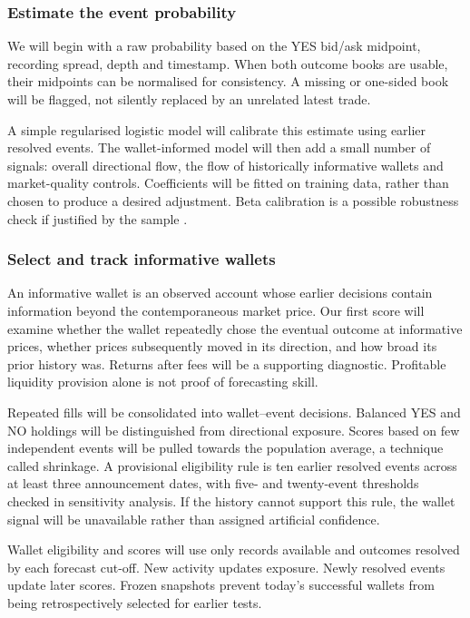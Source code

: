 \clearpage
\subsubsection{Estimate the event probability}
We will begin with a raw probability based on the YES bid/ask midpoint, recording spread, depth and timestamp. When both outcome books are usable, their midpoints can be normalised for consistency. A missing or one-sided book will be flagged, not silently replaced by an unrelated latest trade.

A simple regularised logistic model will calibrate this estimate using earlier resolved events. The wallet-informed model will then add a small number of signals: overall directional flow, the flow of historically informative wallets and market-quality controls. Coefficients will be fitted on training data, rather than chosen to produce a desired adjustment. Beta calibration is a possible robustness check if justified by the sample \cite{kull}.

\subsubsection{Select and track informative wallets}
An informative wallet is an observed account whose earlier decisions contain information beyond the contemporaneous market price. Our first score will examine whether the wallet repeatedly chose the eventual outcome at informative prices, whether prices subsequently moved in its direction, and how broad its prior history was. Returns after fees will be a supporting diagnostic. Profitable liquidity provision alone is not proof of forecasting skill.

Repeated fills will be consolidated into wallet--event decisions. Balanced YES and NO holdings will be distinguished from directional exposure. Scores based on few independent events will be pulled towards the population average, a technique called shrinkage. A provisional eligibility rule is ten earlier resolved events across at least three announcement dates, with five- and twenty-event thresholds checked in sensitivity analysis. If the history cannot support this rule, the wallet signal will be unavailable rather than assigned artificial confidence.

Wallet eligibility and scores will use only records available and outcomes resolved by each forecast cut-off. New activity updates exposure. Newly resolved events update later scores. Frozen snapshots prevent today's successful wallets from being retrospectively selected for earlier tests.

